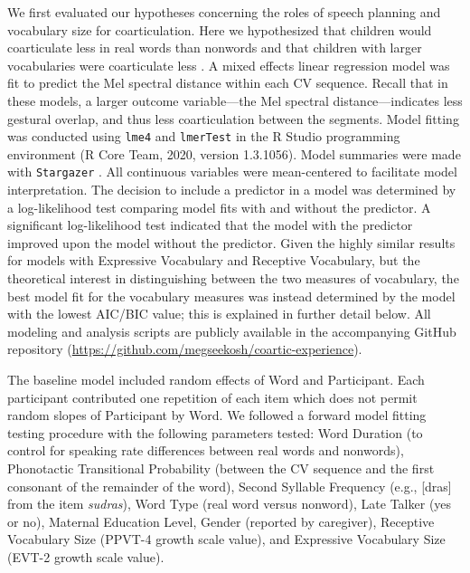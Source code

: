 \documentclass[a4paper,man,natbib,donotrepeattitle, apacite]{apa6}
\begin{document}
We first evaluated our hypotheses concerning the roles of speech planning and vocabulary size for coarticulation. Here we hypothesized that children would coarticulate less in  real words than nonwords and that children with larger vocabularies were coarticulate less \cite{noiraySpokenLanguageDevelopment2019}. A mixed effects linear regression model was fit to predict the Mel spectral distance within each CV sequence. Recall that in these models, a larger outcome variable---the Mel spectral distance---indicates less gestural overlap, and thus less coarticulation between the segments. Model fitting was conducted using \texttt{lme4} \cite{batesFittingLinearMixedeffects2015} and \texttt{lmerTest} \cite{kuznetsovaLmerTestPackageTests2017} in the R Studio programming environment (R Core Team, 2020, version 1.3.1056). Model summaries were made with \texttt{Stargazer} \cite{hlavacStargazerWellFormattedRegression2018}. All continuous variables were mean-centered to facilitate model interpretation. The decision to include a predictor in a model was determined by a log-likelihood test comparing model fits with and without the predictor. A significant log-likelihood test indicated that the model with the predictor improved upon the model without the predictor. Given the highly similar results for models with Expressive Vocabulary and Receptive Vocabulary, but the theoretical interest in distinguishing between the two measures of vocabulary, the best model fit for the vocabulary measures was instead determined by the model with the lowest AIC/BIC value; this is explained in further detail below. All modeling and analysis scripts are publicly available in the accompanying GitHub repository (\url{https://github.com/megseekosh/coartic-experience}). 

The baseline model included random effects of Word and Participant. Each participant contributed one repetition of each item which does not permit random slopes of Participant by Word. We followed a forward model fitting testing procedure with the following parameters tested: Word Duration (to control for speaking rate differences between real words and nonwords), Phonotactic Transitional Probability (between the CV sequence and the first consonant of the remainder of the word), Second Syllable Frequency (e.g., [dras] from the item \textit{sudras}), Word Type (real word versus nonword), Late Talker (yes or no), Maternal Education Level, Gender (reported by caregiver), Receptive Vocabulary Size (PPVT-4 growth scale value), and Expressive Vocabulary Size (EVT-2 growth scale value). 
\end{document}

